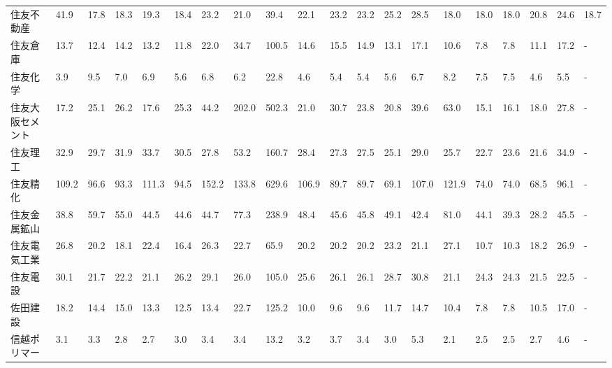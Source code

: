 \begin{longtable}[c]{lp{3mm}p{3mm}p{3mm}p{3mm}p{3mm}p{3mm}p{3mm}p{3mm}p{3mm}p{3mm}p{3mm}p{3mm}p{3mm}p{3mm}p{3mm}p{3mm}p{3mm}p{3mm}p{3mm}}
住友不動産           &   41.9 &   17.8 &      18.3 &      19.3 &       18.4 &    23.2 &    21.0 &     39.4 &    22.1 &    23.2 &   23.2 &   25.2 &    28.5 &    18.0 &    18.0 &   18.0 &   20.8 &    24.6 &   18.7 \\
住友倉庫            &   13.7 &   12.4 &      14.2 &      13.2 &       11.8 &    22.0 &    34.7 &    100.5 &    14.6 &    15.5 &   14.9 &   13.1 &    17.1 &    10.6 &     7.8 &    7.8 &   11.1 &    17.2 &      - \\
住友化学            &    3.9 &    9.5 &       7.0 &       6.9 &        5.6 &     6.8 &     6.2 &     22.8 &     4.6 &     5.4 &    5.4 &    5.6 &     6.7 &     8.2 &     7.5 &    7.5 &    4.6 &     5.5 &      - \\
住友大阪セメント        &   17.2 &   25.1 &      26.2 &      17.6 &       25.3 &    44.2 &   202.0 &    502.3 &    21.0 &    30.7 &   23.8 &   20.8 &    39.6 &    63.0 &    15.1 &   16.1 &   18.0 &    27.8 &      - \\
住友理工            &   32.9 &   29.7 &      31.9 &      33.7 &       30.5 &    27.8 &    53.2 &    160.7 &    28.4 &    27.3 &   27.5 &   25.1 &    29.0 &    25.7 &    22.7 &   23.6 &   21.6 &    34.9 &      - \\
住友精化            &  109.2 &   96.6 &      93.3 &     111.3 &       94.5 &   152.2 &   133.8 &    629.6 &   106.9 &    89.7 &   89.7 &   69.1 &   107.0 &   121.9 &    74.0 &   74.0 &   68.5 &    96.1 &      - \\
住友金属鉱山          &   38.8 &   59.7 &      55.0 &      44.5 &       44.6 &    44.7 &    77.3 &    238.9 &    48.4 &    45.6 &   45.8 &   49.1 &    42.4 &    81.0 &    44.1 &   39.3 &   28.2 &    45.5 &      - \\
住友電気工業          &   26.8 &   20.2 &      18.1 &      22.4 &       16.4 &    26.3 &    22.7 &     65.9 &    20.2 &    20.2 &   20.2 &   23.2 &    21.1 &    27.1 &    10.7 &   10.3 &   18.2 &    26.9 &      - \\
住友電設            &   30.1 &   21.7 &      22.2 &      21.1 &       26.2 &    29.1 &    26.0 &    105.0 &    25.6 &    26.1 &   26.1 &   28.7 &    30.8 &    21.1 &    24.3 &   24.3 &   21.5 &    22.5 &      - \\
佐田建設            &   18.2 &   14.4 &      15.0 &      13.3 &       12.5 &    13.4 &    22.7 &    125.2 &    10.0 &     9.6 &    9.6 &   11.7 &    14.7 &    10.4 &     7.8 &    7.8 &   10.5 &    17.0 &      - \\
信越ポリマー          &    3.1 &    3.3 &       2.8 &       2.7 &        3.0 &     3.4 &     3.4 &     13.2 &     3.2 &     3.7 &    3.4 &    3.0 &     5.3 &     2.1 &     2.5 &    2.5 &    2.7 &     4.6 &      - \\

\end{longtable}
